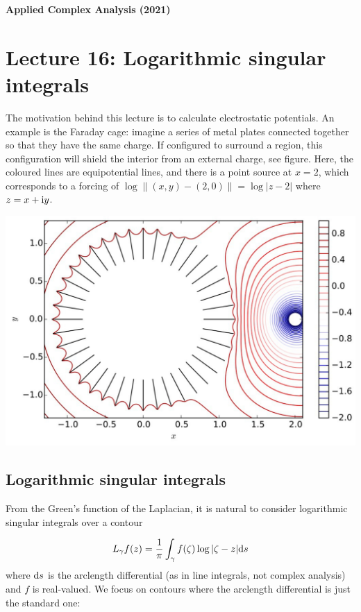 \documentclass[12pt,landscape]{article}
\def\D{ {\rm d} }
\def\I{ {\rm i} }
\def\cent#1{\begin{center}#1\end{center} }
\begin{document}
{\LARGE
\sf
\textbf{Applied Complex Analysis (2021)}

\section{Lecture 16: Logarithmic singular integrals}
%
%
%
The motivation behind this lecture is to calculate electrostatic potentials. An example is the Faraday cage: imagine a series of metal plates connected together so that they have the same charge. If configured to surround a region, this configuration will shield the interior from an external charge, see figure. Here, the coloured lines are equipotential lines, and there is a point source at $x = 2$, which corresponds to a forcing of $\log\| (x,y)  - (2,0) \| = \log|z - 2|$ where  $z = x + \I y$.
\cent{\includegraphics[width=0.67\linewidth]{Laplacetangentialplot.pdf}}


\subsection{Logarithmic singular integrals}
From the Green's function of the Laplacian, it is natural to consider logarithmic singular integrals over a contour

\[
L_\gamma f(z) = {1 \over \pi} \int_\gamma f(\zeta) \log|\zeta-z| \D s
\]
where $\D s$ is the arclength differential (as in line integrals, not complex analysis) and $f$ is real-valued. We focus on contours where the arclength differential is just the standard one:

}
\end{document}
